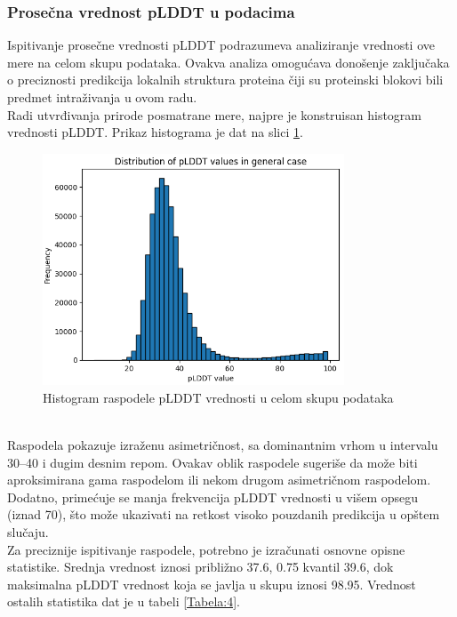\documentclass[a4paper,12pt]{article}
\begin{document}
\subsubsection{Prosečna vrednost pLDDT u podacima}
Ispitivanje prosečne vrednosti pLDDT podrazumeva analiziranje vrednosti ove mere na celom skupu podataka. Ovakva analiza omogućava donošenje zaključaka o preciznosti predikcija lokalnih struktura proteina čiji su proteinski blokovi bili predmet intraživanja u ovom radu. \\
Radi utvrđivanja prirode posmatrane mere, najpre je konstruisan histogram vrednosti pLDDT. Prikaz histograma je dat na slici \ref{Slika:distribution}.
\begin{figure}[htbp]
    	\centering
    	\includegraphics[width=0.8\textwidth]{./images/dist_dataset.png}
    	\caption{Histogram raspodele pLDDT vrednosti u celom skupu podataka}
    	\label{Slika:distribution}
\end{figure}
\\
Raspodela pokazuje izraženu asimetričnost, sa dominantnim vrhom u intervalu 30–40 i dugim desnim repom. Ovakav oblik raspodele sugeriše da može biti aproksimirana gama raspodelom ili nekom drugom asimetričnom raspodelom. Dodatno, primećuje se manja frekvencija pLDDT vrednosti u višem opsegu (iznad 70), što može ukazivati na retkost visoko pouzdanih predikcija u opštem slučaju. \\
Za preciznije ispitivanje raspodele, potrebno je izračunati osnovne opisne statistike. Srednja vrednost iznosi približno 37.6, 0.75 kvantil 39.6, dok maksimalna pLDDT vrednost koja se javlja u skupu iznosi 98.95. Vrednost ostalih statistika dat je u tabeli \ref{Tabela:4}.
\end{document}
